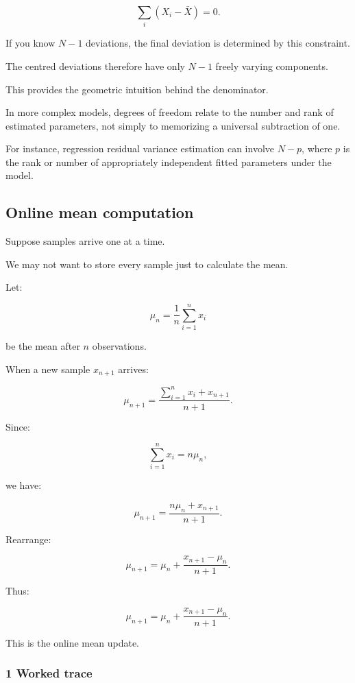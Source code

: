 \[
 \sum_i(X_i-\bar X)=0.
\]

If you know \(N-1\) deviations, the final deviation is determined by this constraint.

The centred deviations therefore have only \(N-1\) freely varying components.

This provides the geometric intuition behind the denominator.

In more complex models, degrees of freedom relate to the number and rank of estimated parameters, not simply to memorizing a universal subtraction of one.

For instance, regression residual variance estimation can involve \(N-p\), where \(p\) is the rank or number of appropriately independent fitted parameters under the model.

\subsection{Online mean computation}\label{02-foundations-ii-ch030-online-mean-computation}

Suppose samples arrive one at a time.

We may not want to store every sample just to calculate the mean.

Let:

\[
 \mu_n= \frac1n\sum_{i=1}^{n}x_i
\]

be the mean after \(n\) observations.

When a new sample \(x_{n+1}\) arrives:

\[
 \mu_{n+1} = \frac{ \sum_{i=1}^{n}x_i+x_{n+1} }{ n+1 }.
\]

Since:

\[
 \sum_{i=1}^{n}x_i=n\mu_n,
\]

we have:

\[
 \mu_{n+1} = \frac{n\mu_n+x_{n+1}}{n+1}.
\]

Rearrange:

\[
 \mu_{n+1} = \mu_n+ \frac{x_{n+1}-\mu_n}{n+1}.
\]

Thus:

\[
 \boxed{ \mu_{n+1} = \mu_n+ \frac{x_{n+1}-\mu_n}{n+1} }.
\]

This is the online mean update.

\subsubsection{1 Worked trace}\label{02-foundations-ii-ch030-worked-trace}

